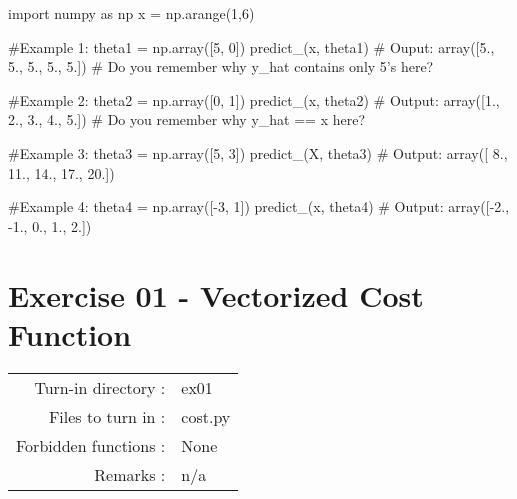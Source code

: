 \documentclass[]{article}
\newenvironment{Shaded}{\begin{snugshade}}{\end{snugshade}}
\newcommand{\CommentTok}[1]{\textcolor[rgb]{0.48,0.49,0.49}{#1}}
\newcommand{\DecValTok}[1]{\textcolor[rgb]{0.96,0.45,0.00}{#1}}
\newcommand{\FloatTok}[1]{\textcolor[rgb]{0.96,0.45,0.00}{#1}}
\newcommand{\ImportTok}[1]{\textcolor[rgb]{0.15,0.68,0.38}{#1}}
\newcommand{\NormalTok}[1]{\textcolor[rgb]{0.81,0.81,0.76}{#1}}
\newcommand{\OperatorTok}[1]{\textcolor[rgb]{0.81,0.81,0.76}{#1}}
\begin{document}
\begin{Shaded}
\begin{Highlighting}[]
\ImportTok{import}\NormalTok{ numpy }\ImportTok{as}\NormalTok{ np}
\NormalTok{x }\OperatorTok{=}\NormalTok{ np.arange(}\DecValTok{1}\NormalTok{,}\DecValTok{6}\NormalTok{)}

\CommentTok{#Example 1:}
\NormalTok{theta1 }\OperatorTok{=}\NormalTok{ np.array([}\DecValTok{5}\NormalTok{, }\DecValTok{0}\NormalTok{])}
\NormalTok{predict_(x, theta1)}
\CommentTok{# Ouput:}
\NormalTok{array([}\FloatTok{5.}\NormalTok{, }\FloatTok{5.}\NormalTok{, }\FloatTok{5.}\NormalTok{, }\FloatTok{5.}\NormalTok{, }\FloatTok{5.}\NormalTok{])}
\CommentTok{# Do you remember why y_hat contains only 5's here?  }


\CommentTok{#Example 2:}
\NormalTok{theta2 }\OperatorTok{=}\NormalTok{ np.array([}\DecValTok{0}\NormalTok{, }\DecValTok{1}\NormalTok{])}
\NormalTok{predict_(x, theta2)}
\CommentTok{# Output:}
\NormalTok{array([}\FloatTok{1.}\NormalTok{, }\FloatTok{2.}\NormalTok{, }\FloatTok{3.}\NormalTok{, }\FloatTok{4.}\NormalTok{, }\FloatTok{5.}\NormalTok{])}
\CommentTok{# Do you remember why y_hat == x here?  }


\CommentTok{#Example 3:}
\NormalTok{theta3 }\OperatorTok{=}\NormalTok{ np.array([}\DecValTok{5}\NormalTok{, }\DecValTok{3}\NormalTok{])}
\NormalTok{predict_(X, theta3)}
\CommentTok{# Output:}
\NormalTok{array([ }\FloatTok{8.}\NormalTok{, }\FloatTok{11.}\NormalTok{, }\FloatTok{14.}\NormalTok{, }\FloatTok{17.}\NormalTok{, }\FloatTok{20.}\NormalTok{])}


\CommentTok{#Example 4:}
\NormalTok{theta4 }\OperatorTok{=}\NormalTok{ np.array([}\OperatorTok{-}\DecValTok{3}\NormalTok{, }\DecValTok{1}\NormalTok{])}
\NormalTok{predict_(x, theta4)}
\CommentTok{# Output:}
\NormalTok{array([}\OperatorTok{-}\FloatTok{2.}\NormalTok{, }\FloatTok{-1.}\NormalTok{,  }\FloatTok{0.}\NormalTok{,  }\FloatTok{1.}\NormalTok{,  }\FloatTok{2.}\NormalTok{])}
\end{Highlighting}
\end{Shaded}

\clearpage

\hypertarget{exercise-01---vectorized-cost-function-1}{%
\section{Exercise 01 - Vectorized Cost
Function}\label{exercise-01---vectorized-cost-function-1}}

\begin{longtable}[]{@{}rl@{}}
\toprule
\endhead
Turn-in directory : & ex01\tabularnewline
Files to turn in : & cost.py\tabularnewline
Forbidden functions : & None\tabularnewline
Remarks : & n/a\tabularnewline
\bottomrule
\end{longtable}
\end{document}
